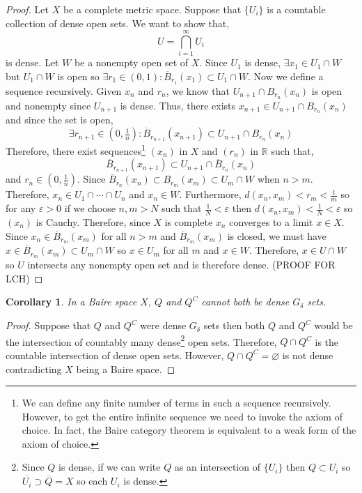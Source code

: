 \documentclass{article}
\newcommand{\ball}[2]{B_{#1} \! \left(#2 \right)}
\newcommand{\cball}[2]{\overline{B}_{#1} \! \left(#2 \right)}
\newcommand{\R}{\mathbb{R}}
\theoremstyle{theorem}
\newtheorem{corollary}[theorem]{Corollary}
\theoremstyle{definition}
\theoremstyle{definition}
\theoremstyle{remark}
\theoremstyle{definition}
\theoremstyle{remark}
\begin{document}
\begin{proof}
Let $X$ be a complete metric space. Suppose that $\{ U_i \}$ is a countable collection of dense open sets. We want to show that,
\[ U = \bigcap_{i = 1}^\infty U_i \]
is dense. Let $W$ be a nonempty open set of $X$. Since $U_1$ is dense, $\exists x_1 \in U_1 \cap W$  but $U_1 \cap W$ is open so $\exists r_1 \in (0, 1) : \cball{r_1}{x_1} \subset U_1 \cap W$. Now we define a sequence recursively. Given $x_n$ and $r_n$, we know that $U_{n+1} \cap \ball{r_n}{x_n}$ is open and nonempty since $U_{n+1}$ is dense. Thus, there exists $x_{n+1} \in U_{n+1} \cap \ball{r_n}{x_n}$ and since the set is open, 
\[ \exists r_{n+1} \in (0, \tfrac{1}{n})  : \cball{r_{n+1}}{x_{n+1}} \subset U_{n+1} \cap \ball{r_n}{x_n} \]
Therefore, there exist sequences\footnote{We can define any finite number of terms in such a sequence recursively. However, to get the entire infinite sequence we need to invoke the axiom of choice. In fact, the Baire category theorem is equivalent to a weak form of the axiom of choice.} $(x_n)$ in $X$ and $(r_n)$ in $\R$ such that,
\[ \cball{r_{n+1}}{x_{n+1}} \subset U_{n+1} \cap \cball{r_{n}}{x_{n}} \]
and $r_n \in (0, \tfrac{1}{n})$. Since $\cball{r_n}{x_n} \subset \ball{r_m}{x_m} \subset U_m \cap W$ when $n > m$. Therefore, $x_n \in U_1 \cap \cdots \cap U_n$ and $x_n \in W$. Furthermore, $d(x_n, x_m) < r_m < \tfrac{1}{m}$ so for any $\varepsilon > 0$ if we choose $n,m > N$ such that $\frac{1}{N} < \varepsilon$ then $d(x_n, x_m) < \frac{1}{N} < \varepsilon$ so $(x_n)$ is Cauchy. Therefore, since $X$ is complete $x_n$ converges to a limit $x \in X$. Since $x_n \in \cball{r_m}{x_m}$ for all $n > m$ and $\cball{r_m}{x_m}$ is closed, we must have $x \in \cball{r_m}{x_m} \subset U_m \cap W$ so $x \in U_m$ for all $m$ and $x \in W$. Therefore, $x \in U \cap W$ so $U$ intersects any nonempty open set and is therefore dense.  
(PROOF FOR LCH)
\end{proof}

\begin{corollary}
In a Baire space $X$, $Q$ and $Q^C$ cannot both be dense $G_{\delta}$ sets.
\end{corollary}

\begin{proof}
Suppose that $Q$ and $Q^C$ were dense $G_{\delta}$ sets then both $Q$ and $Q^C$ would be the intersection of countably many dense\footnote{Since $Q$ is dense, if we can write $Q$ as an intersection of $\{ U_i \}$ then $Q \subset U_i$ so $\overline{U_i} \supset \overline{Q} = X$ so each $U_i$ is dense.} open sets. Therefore, $Q \cap Q^C$ is the countable intersection of dense open sets. However, $Q \cap Q^C = \varnothing$ is not dense contradicting $X$ being a Baire space. 
\end{proof}
\end{document}

